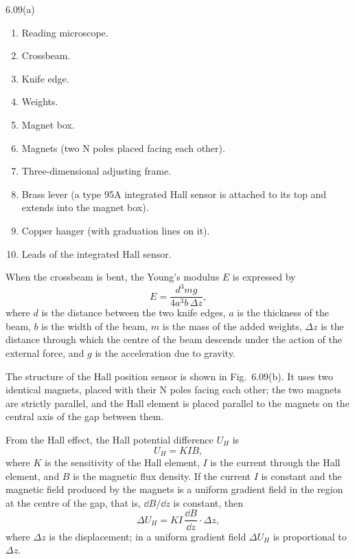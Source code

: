 \begin{figbox}{6.09(a)}
\smallskip
{\footnotesize
\begin{minipage}{0.94\linewidth}
\begin{enumerate}[label=\arabic*.,leftmargin=1.4em,itemsep=0pt,topsep=0pt]
\item Reading microscope. \item Crossbeam. \item Knife edge. \item Weights. \item Magnet box.
\item Magnets (two N poles placed facing each other). \item Three-dimensional adjusting frame.
\item Brass lever (a type 95A integrated Hall sensor is attached to its top and extends into the magnet box).
\item Copper hanger (with graduation lines on it). \item Leads of the integrated Hall sensor.
\end{enumerate}
\end{minipage}}
\end{figbox}

When the crossbeam is bent, the Young's modulus $E$ is expressed by
\begin{equation}\tag{4}
E=\frac{d^{3}mg}{4a^{3}b\,\Delta z},
\end{equation}
where $d$ is the distance between the two knife edges, $a$ is the thickness of the beam, $b$ is the width of the beam, $m$ is the mass of the added weights, $\Delta z$ is the distance through which the centre of the beam descends under the action of the external force, and $g$ is the acceleration due to gravity.

The structure of the Hall position sensor is shown in Fig.~6.09(b). It uses two identical magnets, placed with their N poles facing each other; the two magnets are strictly parallel, and the Hall element is placed parallel to the magnets on the central axis of the gap between them.

From the Hall effect, the Hall potential difference $U_H$ is
\begin{equation}\tag{5}
U_H=KIB,
\end{equation}
where $K$ is the sensitivity of the Hall element, $I$ is the current through the Hall element, and $B$ is the magnetic flux density. If the current $I$ is constant and the magnetic field produced by the magnets is a uniform gradient field in the region at the centre of the gap, that is, $\dd B/\dd z$ is constant, then
\begin{equation}\tag{6}
\Delta U_H=KI\,\frac{\dd B}{\dd z}\cdot\Delta z,
\end{equation}
where $\Delta z$ is the displacement; in a uniform gradient field $\Delta U_H$ is proportional to $\Delta z$.

